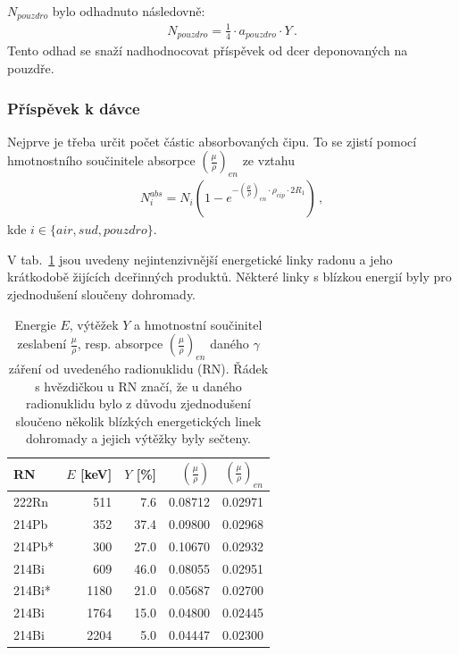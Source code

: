 \documentclass[11pt,a4paper]{article}
\begin{document}
 $N_{pouzdro}$ bylo odhadnuto následovně:
\begin{align}
N_{pouzdro}=\frac{1}{4}\cdot a_{pouzdro}\cdot Y\,.
\end{align}
Tento odhad se snaží nadhodnocovat příspěvek od dcer deponovaných na pouzdře.

\subsubsection{Příspěvek k dávce}
Nejprve je třeba určit počet částic absorbovaných čipu. To se zjistí pomocí hmotnostního součinitele absorpce $\left(\frac{\mu}{\rho}\right)_{en}$ ze vztahu
\begin{align}
N_{i}^{abs}=N_i\left(1-e^{-\left(\frac{\mu}{\rho}\right)_{en}\cdot \rho_{cip}\cdot 2R_1}\right)\,,
\end{align}
kde $i\in\{air, sud, pouzdro\}$.

V tab.~\ref{tab:gamy} jsou uvedeny nejintenzivnější energetické linky radonu a jeho krátkodobě žijících dceřinných produktů. Některé linky s  blízkou energií byly pro zjednodušení sloučeny dohromady. 
\begin{table}[ht]
	\centering
	\caption{Energie $E$, výtěžek $Y$ a hmotnostní součinitel zeslabení $\frac{\mu}{\rho}$, resp. absorpce $\left(\frac{\mu}{\rho}\right)_{en}$ daného $\gamma$ záření od uvedeného radionuklidu (RN). Řádek s hvězdičkou u RN značí, že u daného radionuklidu bylo z důvodu zjednodušení sloučeno několik blízkých energetických linek dohromady a jejich výtěžky byly sečteny.}
	\label{tab:gamy}
	\begin{tabular}{lrrrr}
		\toprule	 
		RN &  $E$ [keV] &  $Y$ [\%] &       $\left(\frac{\mu}{\rho}\right)$ &    $\left(\frac{\mu}{\rho}\right)_{en}$ \\
		\midrule
		222Rn  &   511 &  7.6 &  0.08712 &  0.02971 \\
		214Pb  &   352 &  37.4 &  0.09800 &  0.02968 \\
		214Pb* &   300 &  27.0 &  0.10670 &  0.02932 \\
		214Bi  &   609 &  46.0 &  0.08055 &  0.02951 \\
		214Bi* &  1180 &  21.0 &  0.05687 &  0.02700 \\
		214Bi  &  1764 &  15.0 &  0.04800 &  0.02445 \\
		214Bi  &  2204 &  5.0 &  0.04447 &  0.02300 \\
		\bottomrule
	\end{tabular}
\end{table}
\end{document}
